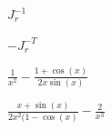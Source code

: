 \documentclass{article}
\begin{document}
$ J_r^{-1} $
\pagebreak

$ -J_r^{-T} $
\pagebreak

$ \frac{1}{x^2} - \frac{1+\cos(x)}{2 x \sin(x)} $
\pagebreak

$ \frac{x + \sin(x)}{2x^2(1-\cos(x)} - \frac{2}{x^3}$
\pagebreak
\end{document}
